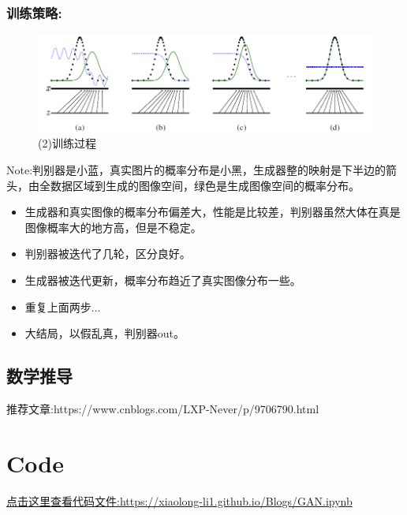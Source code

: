 \documentclass[]{report}
\begin{document}
\subsubsection{训练策略:}
\begin{figure}[hb]
	\centering
	\includegraphics[width=0.7\linewidth]{screenshot002}
	\caption{(2)训练过程}
	\label{fig:screenshot002}
\end{figure}
\indent Note:判别器是小蓝，真实图片的概率分布是小黑，生成器整的映射是下半边的箭头，由全数据区域到生成的图像空间，绿色是生成图像空间的概率分布。
\begin{itemize}
	\item 生成器和真实图像的概率分布偏差大，性能是比较差，判别器虽然大体在真是图像概率大的地方高，但是不稳定。
	\item 判别器被迭代了几轮，区分良好。
	\item 生成器被迭代更新，概率分布趋近了真实图像分布一些。
	\item 重复上面两步...
	\item 大结局，以假乱真，判别器out。
\end{itemize}
\subsection{数学推导}
推荐文章:https://www.cnblogs.com/LXP-Never/p/9706790.html
\section{Code}
\href{run:GAN.ipynb}{点击这里查看代码文件:https://xiaolong-li1.github.io/Blogs/GAN.ipynb}
\end{document}
